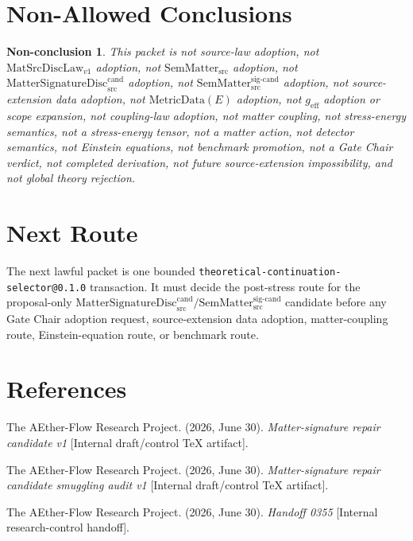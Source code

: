 \documentclass[11pt]{article}
\newcommand{\MetricData}{\mathrm{MetricData}}
\newcommand{\geff}{g_{\mathrm{eff}}}
\newcommand{\MatSrcDiscLaw}{\mathrm{MatSrcDiscLaw}_{v1}}
\newcommand{\SemMatterSrc}{\mathrm{SemMatter}_{\mathrm{src}}}
\newcommand{\SemMatterSig}{\mathrm{SemMatter}_{\mathrm{src}}^{\mathrm{sig\text{-}cand}}}
\newcommand{\MatSigDisc}{\mathrm{MatterSignatureDisc}_{\mathrm{src}}^{\mathrm{cand}}}
\newtheorem{nonconclusion}{Non-conclusion}
\begin{document}
\section{Non-Allowed Conclusions}

\begin{nonconclusion}
This packet is not source-law adoption, not \(\MatSrcDiscLaw\) adoption, not
\(\SemMatterSrc\) adoption, not \(\MatSigDisc\) adoption, not
\(\SemMatterSig\) adoption, not source-extension data adoption, not
\(\MetricData(E)\) adoption, not \(\geff\) adoption or scope expansion, not
coupling-law adoption, not matter coupling, not stress-energy semantics, not a
stress-energy tensor, not a matter action, not detector semantics, not
Einstein equations, not benchmark promotion, not a Gate Chair verdict, not
completed derivation, not future source-extension impossibility, and not
global theory rejection.
\end{nonconclusion}

\section{Next Route}

The next lawful packet is one bounded
\texttt{theoretical-continuation-selector@0.1.0} transaction. It must decide
the post-stress route for the proposal-only \(\MatSigDisc / \SemMatterSig\)
candidate before any Gate Chair adoption request, source-extension data
adoption, matter-coupling route, Einstein-equation route, or benchmark route.

\section*{References}

The AEther-Flow Research Project. (2026, June 30). \emph{Matter-signature
repair candidate v1} [Internal draft/control TeX artifact].

The AEther-Flow Research Project. (2026, June 30). \emph{Matter-signature
repair candidate smuggling audit v1} [Internal draft/control TeX artifact].

The AEther-Flow Research Project. (2026, June 30). \emph{Handoff 0355}
[Internal research-control handoff].
\end{document}
